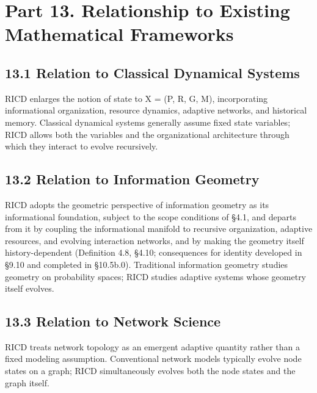 \documentclass[
]{article}
\begin{document}
\hypertarget{part-13.-relationship-to-existing-mathematical-frameworks}{%
\section{Part 13. Relationship to Existing Mathematical
Frameworks}\label{part-13.-relationship-to-existing-mathematical-frameworks}}

\hypertarget{relation-to-classical-dynamical-systems}{%
\subsection{13.1 Relation to Classical Dynamical
Systems}\label{relation-to-classical-dynamical-systems}}

RICD enlarges the notion of state to X = (P, R, G, M), incorporating
informational organization, resource dynamics, adaptive networks, and
historical memory. Classical dynamical systems generally assume fixed
state variables; RICD allows both the variables and the organizational
architecture through which they interact to evolve recursively.

\hypertarget{relation-to-information-geometry}{%
\subsection{13.2 Relation to Information
Geometry}\label{relation-to-information-geometry}}

RICD adopts the geometric perspective of information geometry as its
informational foundation, subject to the scope conditions of §4.1, and
departs from it by coupling the informational manifold to recursive
organization, adaptive resources, and evolving interaction networks, and
by making the geometry itself history-dependent (Definition 4.8, §4.10;
consequences for identity developed in §9.10 and completed in §10.5b.0).
Traditional information geometry studies geometry on probability spaces;
RICD studies adaptive systems whose geometry itself evolves.

\hypertarget{relation-to-network-science}{%
\subsection{13.3 Relation to Network
Science}\label{relation-to-network-science}}

RICD treats network topology as an emergent adaptive quantity rather
than a fixed modeling assumption. Conventional network models typically
evolve node states on a graph; RICD simultaneously evolves both the node
states and the graph itself.
\end{document}
